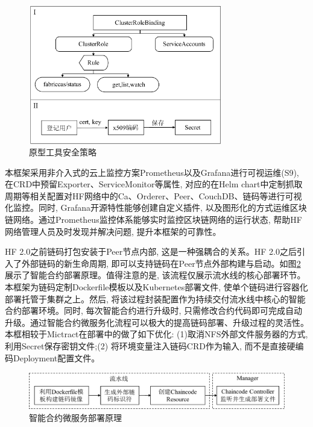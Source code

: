 \begin{figure}[h] %
    \centering %
    \includegraphics[width=0.75\textwidth]{FIGs/chapter5/safety.pdf} %
    \caption{原型工具安全策略} %
    \label{safety} %
\end{figure}%

本框架采用非介入式的云上监控方案Prometheus以及Grafana进行可视运维(S9), 在CRD中预留Exporter、ServiceMonitor等属性, 对应的在Helm chart中定制抓取周期等相关配置对HF网络中的Ca、Orderer、Peer、CouchDB、链码等进行可视化监控。同时, Grafana开源特性能够创建自定义插件, 以及图形化的方式运维区块链网络。通过Prometheus监控体系能够实时监控区块链网络的运行状态, 帮助HF网络管理人员及时发现并解决问题, 提升本框架的可靠性。

HF 2.0之前链码打包安装于Peer节点内部, 这是一种强耦合的关系。HF 2.0之后引入了外部链码的新生命周期, 即可以支持链码在Peer节点外部构建与启动。如图\ref{external_cc}展示了智能合约部署原理。值得注意的是, 该流程仅展示流水线的核心部署环节。本框架为链码定制Dockerfile模板以及Kubernetes部署文件, 使单个链码进行容器化部署托管于集群之上。然后, 将该过程封装配置作为持续交付流水线中核心的智能合约部署环境。同时, 每次智能合约进行升级时, 只需修改合约代码即可完成自动升级。通过智能合约微服务化流程可以极大的提高链码部署、升级过程的灵活性。本框相较于Mictract在部署中的做了如下优化: (1)取消NFS外部文件服务器的方式, 利用Secret保存密钥文件;(2) 将环境变量注入链码CRD作为输入, 而不是直接硬编码Deployment配置文件。

\begin{figure}[h] %
    \centering %
    \includegraphics[width=1.0\textwidth]{FIGs/chapter5/external_cc.pdf} %
    \caption{智能合约微服务部署原理} %
    \label{external_cc} %
\end{figure}%


